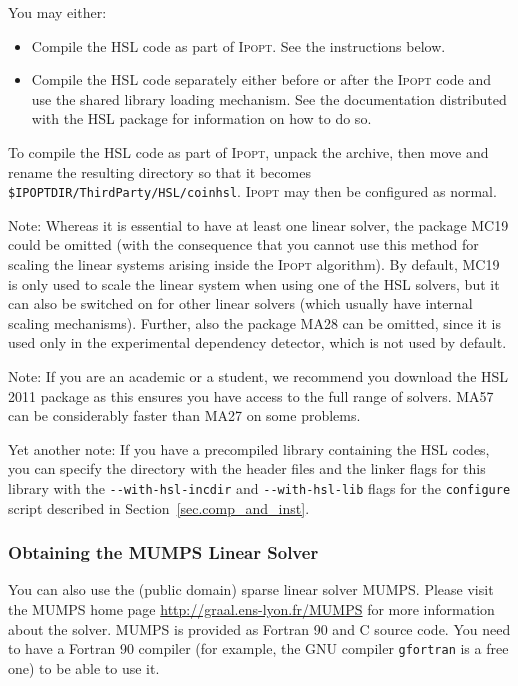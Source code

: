 \documentclass[10pt]{article}
\newcommand{\Ipopt}{\textsc{Ipopt}\xspace}
\begin{document}
\noindent
You may either:
\begin{itemize}
   \item Compile the HSL code as part of \Ipopt. See the instructions below.
   \item Compile the HSL code separately either before or after the \Ipopt code
      and use the shared library loading mechanism. See the documentation
      distributed with the HSL package for information on how to do so.
\end{itemize}

To compile the HSL code as part of \Ipopt, unpack the archive, then move and
rename the resulting directory so that it becomes
{\tt \$IPOPTDIR/ThirdParty/HSL/coinhsl}. \Ipopt may then be configured as
normal.

Note: Whereas it is essential to have at least one linear solver, the
package MC19 could be omitted (with the consequence that you cannot
use this method for scaling the linear systems arising inside the
\Ipopt algorithm).  By default, MC19 is only used to scale the linear
system when using one of the HSL solvers, but it can also be
switched on for other linear solvers (which usually have internal
scaling mechanisms).
Further, also the package MA28 can be omitted, since it is used only
in the experimental dependency detector, which is not used by default.

Note: If you are an academic or a student, we recommend you download the
HSL 2011 package as this ensures you have access to the full range of solvers.
MA57 can be considerably faster than MA27 on some problems.

Yet another note: If you have a precompiled library containing the
HSL codes, you can specify the directory with the header files and
the linker flags for this library with the \verb|--with-hsl-incdir| and
\verb|--with-hsl-lib| flags for the {\tt configure} script described in
Section~\ref{sec.comp_and_inst}.

\subsubsection{Obtaining the MUMPS Linear Solver}\label{sec:MUMPS}

You can also use the (public domain) sparse linear solver MUMPS.
Please visit the MUMPS home page \url{http://graal.ens-lyon.fr/MUMPS}
for more information about the solver. MUMPS is provided as Fortran 90
and C source code.  You need to have a Fortran 90 compiler (for
example, the GNU compiler {\tt gfortran} is a free one) to be able to
use it.
\end{document}
